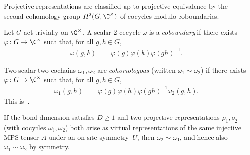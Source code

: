 Projective representations are classified up to projective equivalence by the
second cohomology group $H^2(G,\C^{\times})$ of cocycles modulo coboundaries.

\begin{definition}[Coboundary]\label{def:is_coboundary}
    \mathlibok %
    Let $G$ act trivially on $\C^{\times}$.
    A scalar 2-cocycle $\omega$ is a \emph{coboundary} if there exists
    $\varphi \colon G \to \C^{\times}$ such that, for all $g,h \in G$,
    \begin{align}
        \omega(g,h)
         & =\varphi(g)\varphi(h)\varphi(gh)^{-1}.
        \label{eq:symmetry_coboundary}
    \end{align}
\end{definition}

\begin{definition}\label{def:cohomologous_to}
    \leanok
    Two scalar two-cochains $\omega_1,\omega_2$ are \emph{cohomologous}
    (written $\omega_1 \sim \omega_2$) if there exists
    $\varphi \colon G \to \C^{\times}$ such that, for all $g,h \in G$,
    \begin{align}
        \omega_1(g,h)
         & =\varphi(g)\varphi(h)\varphi(gh)^{-1}\omega_2(g,h).
        \label{eq:symmetry_cohomologous}
    \end{align}
    This is~\cite[``Cohomologous cochains'']{QICLean2026Blueprint}.
\end{definition}

\begin{lemma}%
    \label{thm:cocycle_gauge_independence}
    \leanok
    If the bond dimension satisfies $D \ge 1$ and two projective
    representations $\rho_1,\rho_2$ (with cocycles
    $\omega_1,\omega_2$) both arise as virtual representations of the
    same injective MPS tensor $A$ under an on-site symmetry~$U$, then
    $\omega_2\sim\omega_1$, and hence also $\omega_1\sim\omega_2$ by symmetry.
\end{lemma}

